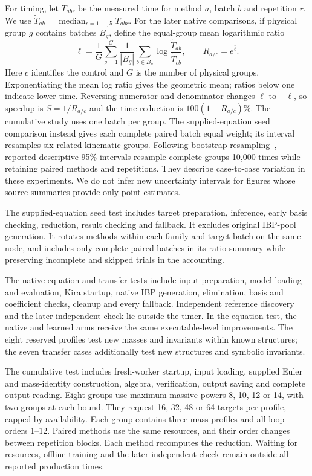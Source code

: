For timing, let $T_{abr}$ be the measured time for method $a$, batch $b$ and repetition $r$. We use $\widetilde T_{ab}=\operatorname{median}_{r=1,\ldots,5}T_{abr}$. For the later native comparisons, if physical group $g$ contains batches $B_g$, define the equal-group mean logarithmic ratio
\begin{equation}
 \overline\ell=\frac1G\sum_{g=1}^G\frac1{|B_g|}
 \sum_{b\in B_g}\log\frac{\widetilde T_{ab}}{\widetilde T_{cb}},
 \qquad R_{a/c}=e^{\overline\ell}.
 \label{history:eq:ratio}
\end{equation}
Here $c$ identifies the control and $G$ is the number of physical groups. Exponentiating the mean log ratio gives the geometric mean; ratios below one indicate lower time. Reversing numerator and denominator changes $\overline\ell$ to $-\overline\ell$, so speedup is $S=1/R_{a/c}$ and the time reduction is $100(1-R_{a/c})\%$. The cumulative study uses one batch per group. The supplied-equation seed comparison instead gives each complete paired batch equal weight; its interval resamples six related kinematic groups. Following bootstrap resampling~\cite{Efron1979}, reported descriptive 95\% intervals resample complete groups 10,000 times while retaining paired methods and repetitions. They describe case-to-case variation in these experiments. We do not infer new uncertainty intervals for figures whose source summaries provide only point estimates.

The supplied-equation seed test includes target preparation, inference, early basis checking, reduction, result checking and fallback. It excludes original IBP-pool generation. It rotates methods within each family and target batch on the same node, and includes only complete paired batches in its ratio summary while preserving incomplete and skipped trials in the accounting.

The native equation and transfer tests include input preparation, model loading and evaluation, Kira startup, native IBP generation, elimination, basis and coefficient checks, cleanup and every fallback. Independent reference discovery and the later independent check lie outside the timer. In the equation test, the native and learned arms receive the same executable-level improvements. The eight reserved profiles test new masses and invariants within known structures; the seven transfer cases additionally test new structures and symbolic invariants.

The cumulative test includes fresh-worker startup, input loading, supplied Euler and mass-identity construction, algebra, verification, output saving and complete output reading. Eight groups use maximum massive powers 8, 10, 12 or 14, with two groups at each bound. They request 16, 32, 48 or 64 targets per profile, capped by availability. Each group contains three mass profiles and all loop orders 1--12. Paired methods use the same resources, and their order changes between repetition blocks. Each method recomputes the reduction. Waiting for resources, offline training and the later independent check remain outside all reported production times.

